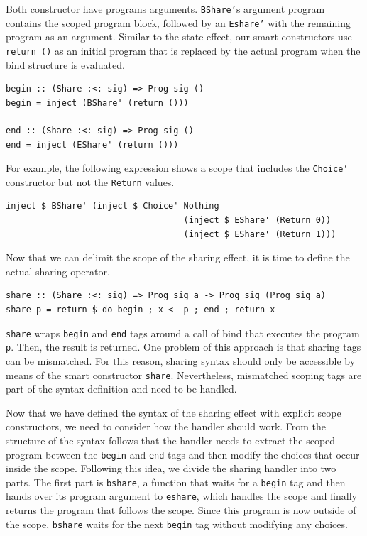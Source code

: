 \documentclass[a4paper, 11pt, fleqn, twoside]{scrreprt}
\newcommand{\hinl}[1]{\texttt{#1}}
\begin{document}
Both constructor have programs arguments.
\hinl{BShare'}s argument program contains the scoped program block, followed by an \hinl{Eshare'} with the remaining program as an argument.
Similar to the state effect, our smart constructors use \hinl{return ()} as an initial program that is replaced by the actual program when the bind structure is evaluated.

\begin{verbatim}
begin :: (Share :<: sig) => Prog sig ()
begin = inject (BShare' (return ()))

end :: (Share :<: sig) => Prog sig ()
end = inject (EShare' (return ()))
\end{verbatim}

For example, the following expression shows a scope that includes the \hinl{Choice'} constructor but not the \hinl{Return} values.

\begin{verbatim}
inject $ BShare' (inject $ Choice' Nothing 
                                   (inject $ EShare' (Return 0))
                                   (inject $ EShare' (Return 1)))
\end{verbatim}

Now that we can delimit the scope of the sharing effect, it is time to define the actual sharing operator.


\begin{verbatim}
share :: (Share :<: sig) => Prog sig a -> Prog sig (Prog sig a)
share p = return $ do begin ; x <- p ; end ; return x
\end{verbatim}

\hinl{share} wraps \hinl{begin} and \hinl{end} tags around a call of bind that executes the program \hinl{p}.
Then, the result is returned.
One problem of this approach is that sharing tags can be mismatched.
For this reason, sharing syntax should only be accessible by means of the smart constructor \hinl{share}.
Nevertheless, mismatched scoping tags are part of the syntax definition and need to be handled.

Now that we have defined the syntax of the sharing effect with explicit scope constructors, we need to consider how the handler should work.
From the structure of the syntax follows that the handler needs to extract the scoped program between the \hinl{begin} and \hinl{end} tags and then modify the choices that occur inside the scope.
Following this idea, we divide the sharing handler into two parts.
The first part is \hinl{bshare}, a function that waits for a \hinl{begin} tag and then hands over its program argument to \hinl{eshare}, which handles the scope and finally returns the program that follows the scope.
Since this program is now outside of the scope, \hinl{bshare} waits for the next \hinl{begin} tag without modifying any choices.
\end{document}
